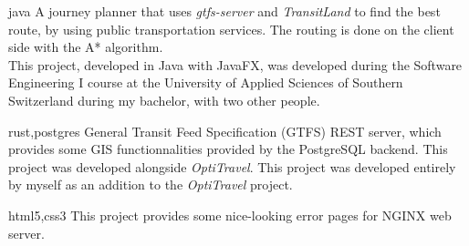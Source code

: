 \begin{CV}


    

    
    

    {}
    {java}
    {A journey planner that uses \textit{gtfs-server} and \textit{TransitLand} to find the best route, by using
    public transportation services. The routing is done on the client side with the A* algorithm.\\
    This project, developed in Java with JavaFX, was developed during the Software Engineering I course
    at the University of Applied Sciences of Southern Switzerland during my bachelor,
    with two other people.}

    
    {}
    {rust,postgres}
    {General Transit Feed Specification (GTFS) REST server, which provides some GIS functionnalities provided
    by the PostgreSQL backend. This project was developed alongside \textit{OptiTravel}.
    This project was developed entirely by myself as an addition to the \textit{OptiTravel} project.}


    {}
    {html5,css3}
    {This project provides some nice-looking error pages for NGINX web server.}
    

\end{CV}

